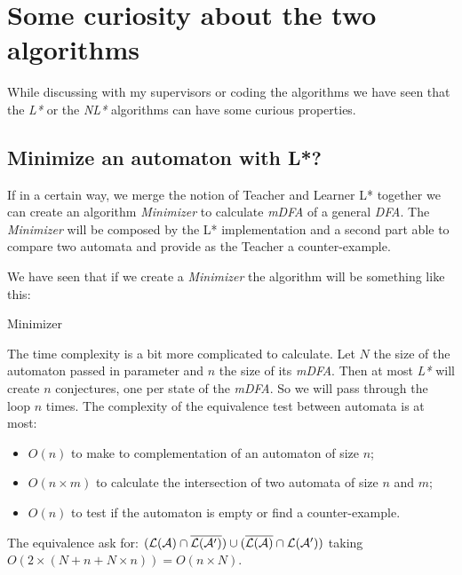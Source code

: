 \section{Some curiosity about the two algorithms}

While discussing with my supervisors or coding the algorithms we have seen that the \textit{L*} or the \textit{NL*} algorithms can have some curious properties.

\subsection{Minimize an automaton with L*?}

If in a certain way, we merge the notion of Teacher and Learner L* together we can create an algorithm \textit{Minimizer} to calculate \textit{mDFA} of a general \textit{DFA}. The \textit{Minimizer} will be composed by the L* implementation and a second part able to compare two automata and provide as the Teacher a counter-example.

We have seen that if we create a \textit{Minimizer} the algorithm will be something like this:

\begin{algorithm}[h]
  \caption{Minimizer}

\end{algorithm}



The time complexity is a bit more complicated to calculate. Let $N$ the size of the automaton passed in parameter and $n$ the size of its \textit{mDFA}. Then at most \textit{L*} will create $n$ conjectures, one per state of the \textit{mDFA}. So we will pass through the loop $n$ times. The complexity of the equivalence test between automata is at most:
\begin{itemize}
  \item $O(n)$ to make to complementation of an automaton of size $n$;
  \item $O(n \times m)$ to calculate the intersection of two automata of size $n$ and $m$;
  \item $O(n)$ to test if the automaton is empty or find a counter-example.
\end{itemize}
The equivalence ask for: $(\mathcal{L}(\mathcal{A}) \cap \overline{\mathcal{L}(\mathcal{A}')}) \cup (\overline{\mathcal{L}(\mathcal{A})} \cap \mathcal{L}(\mathcal{A}'))$ taking $O(2 \times (N + n + N \times n)) = O(n \times N)$.

